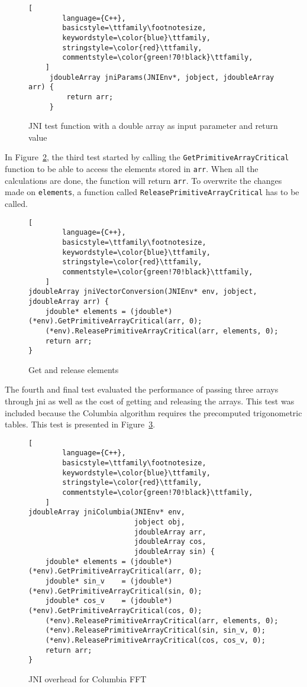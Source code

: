 \begin{figure}[H]
\begin{lstlisting}[
        language={C++},
        basicstyle=\ttfamily\footnotesize,
        keywordstyle=\color{blue}\ttfamily,
        stringstyle=\color{red}\ttfamily,
        commentstyle=\color{green!70!black}\ttfamily,
    ]
     jdoubleArray jniParams(JNIEnv*, jobject, jdoubleArray arr) {
         return arr;
     }
\end{lstlisting}
\caption{JNI test function with a double array as input parameter and return value}
\label{fig:jni:params}
\end{figure}

In Figure~\ref{fig:jni:conversion}, the third test started by calling the \texttt{GetPrimitiveArrayCritical} function to be able to access the elements stored in \texttt{arr}. When all the calculations are done, the function will return \texttt{arr}. To overwrite the changes made on \texttt{elements}, a function called \texttt{ReleasePrimitiveArrayCritical} has to be called.

\begin{figure}
\begin{lstlisting}[
        language={C++},
        basicstyle=\ttfamily\footnotesize,
        keywordstyle=\color{blue}\ttfamily,
        stringstyle=\color{red}\ttfamily,
        commentstyle=\color{green!70!black}\ttfamily,
    ]
jdoubleArray jniVectorConversion(JNIEnv* env, jobject, jdoubleArray arr) {
    jdouble* elements = (jdouble*)(*env).GetPrimitiveArrayCritical(arr, 0);
    (*env).ReleasePrimitiveArrayCritical(arr, elements, 0);
    return arr;
}
\end{lstlisting}
\caption{Get and release elements}
\label{fig:jni:conversion}
\end{figure}

The fourth and final test evaluated the performance of passing three arrays through \gls{jni} as well as the cost of getting and releasing the arrays. This test was included because the Columbia algorithm requires the precomputed trigonometric tables. This test is presented in Figure~\ref{fig:jni:columbia}.

\begin{figure}
\begin{lstlisting}[
        language={C++},
        basicstyle=\ttfamily\footnotesize,
        keywordstyle=\color{blue}\ttfamily,
        stringstyle=\color{red}\ttfamily,
        commentstyle=\color{green!70!black}\ttfamily,
    ]
jdoubleArray jniColumbia(JNIEnv* env,
                         jobject obj,
                         jdoubleArray arr,
                         jdoubleArray cos,
                         jdoubleArray sin) {
    jdouble* elements = (jdouble*)(*env).GetPrimitiveArrayCritical(arr, 0);
    jdouble* sin_v    = (jdouble*)(*env).GetPrimitiveArrayCritical(sin, 0);
    jdouble* cos_v    = (jdouble*)(*env).GetPrimitiveArrayCritical(cos, 0);
    (*env).ReleasePrimitiveArrayCritical(arr, elements, 0);
    (*env).ReleasePrimitiveArrayCritical(sin, sin_v, 0);
    (*env).ReleasePrimitiveArrayCritical(cos, cos_v, 0);
    return arr;
}
\end{lstlisting}
\caption{JNI overhead for Columbia FFT}
\label{fig:jni:columbia}
\end{figure}


